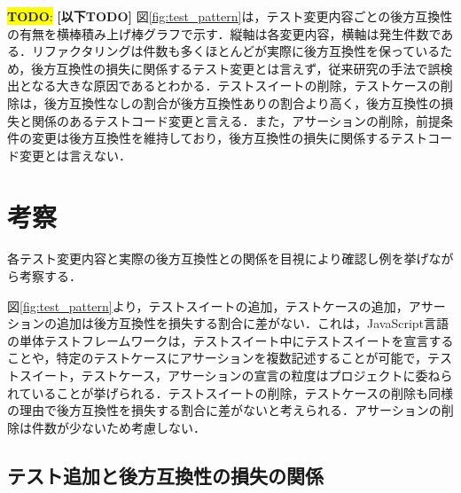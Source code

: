 \documentclass[11pt,dvipdfmx]{jreport}
\newcommand{\todo}[1]{\colorbox{yellow}{{\bf TODO}:}{\color{red} {\textbf{[#1]}}}}
\begin{document}
\todo{以下TODO}
図\ref{fig:test_pattern}は，テスト変更内容ごとの後方互換性の有無を横棒積み上げ棒グラフで示す．縦軸は各変更内容，横軸は発生件数である．リファクタリングは件数も多くほとんどが実際に後方互換性を保っているため，後方互換性の損失に関係するテスト変更とは言えず，従来研究の手法で誤検出となる大きな原因であるとわかる．テストスイートの削除，テストケースの削除は，後方互換性なしの割合が後方互換性ありの割合より高く，後方互換性の損失と関係のあるテストコード変更と言える．また，アサーションの削除，前提条件の変更は後方互換性を維持しており，後方互換性の損失に関係するテストコード変更とは言えない．

\section{考察}
各テスト変更内容と実際の後方互換性との関係を目視により確認し例を挙げながら考察する．

図\ref{fig:test_pattern}より，テストスイートの追加，テストケースの追加，アサーションの追加は後方互換性を損失する割合に差がない．これは，JavaScript言語の単体テストフレームワークは，テストスイート中にテストスイートを宣言することや，特定のテストケースにアサーションを複数記述することが可能で，テストスイート，テストケース，アサーションの宣言の粒度はプロジェクトに委ねられていることが挙げられる．テストスイートの削除，テストケースの削除も同様の理由で後方互換性を損失する割合に差がないと考えられる．アサーションの削除は件数が少ないため考慮しない．

\subsection{テスト追加と後方互換性の損失の関係}
\end{document}

